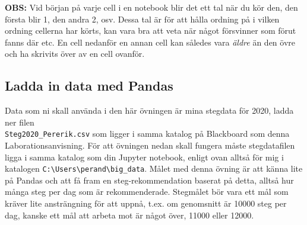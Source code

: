 \documentclass{article}
\begin{document}
\textbf{OBS:} Vid början på varje cell i en notebook blir det ett tal när du kör den, den första blir 1, den andra 2, osv. Dessa tal är för att hålla ordning på i vilken ordning cellerna har körts, kan vara bra att veta när något försvinner som förut fanns där etc. En cell nedanför en annan cell kan således vara \emph{äldre} än den övre och ha skrivits över av en cell ovanför.

\subsection{Ladda in data med Pandas}
Data som ni skall använda i den här övningen är mina stegdata för 2020, ladda ner filen\\ \verb+Steg2020_Pererik.csv+ som ligger i samma katalog på Blackboard som denna Laborationsanvisning. För att övningen nedan skall fungera måste stegdatafilen ligga i samma katalog som din Jupyter notebook, enligt ovan alltså för mig i katalogen \verb+C:\Users\perand\big_data+. Målet med denna övning är att känna lite på Pandas och att få fram en steg-rekommendation baserat på detta, alltså hur många steg  per dag som är rekommenderade. Stegmålet bör vara ett mål som kräver lite ansträngning för att uppnå, t.ex. om genomsnitt är 10000 steg per dag, kanske ett mål att arbeta mot är något över, 11000 eller 12000. 
\end{document}
